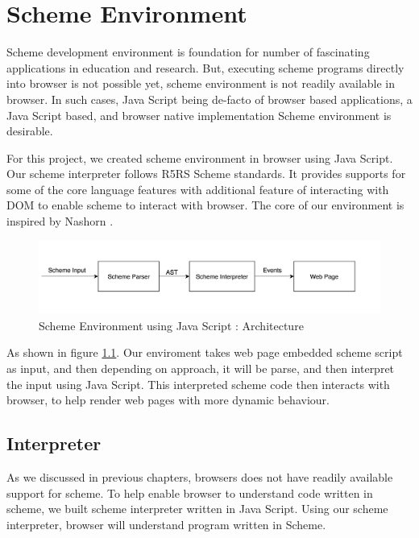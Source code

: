 \chapter{Scheme Environment}

Scheme development environment is foundation for number of fascinating applications in education and research. But, executing scheme programs directly into browser is not possible yet, scheme environment is not readily available in browser. In such cases, Java Script being de-facto of browser based applications, a Java Script based, and browser native implementation Scheme environment is desirable.

For this project, we created scheme environment in browser using Java Script. Our scheme interpreter follows R5RS Scheme standards. It provides supports for some of the core language features with additional feature of interacting with DOM to enable scheme to interact with browser.  The core of our environment is inspired by Nashorn \cite{javascripting}. 

\begin{figure}[ht]
	\begin{center}
		\includegraphics[width=\linewidth]{./images/SchemeEnvironmentusingJavaScript.png}
	\end{center}
	\caption{Scheme Environment using Java Script : Architecture}
	\label{fig:SchemeEnvironmentusingJavaScript}
\end{figure}


As shown in figure \ref{fig:SchemeEnvironmentusingJavaScript}. Our enviroment takes web page embedded scheme script as input, and then depending on approach, it will be parse, and then interpret the input using Java Script. This interpreted  scheme code then interacts with browser, to help render web pages with more dynamic behaviour. 

\section{Interpreter} 
As we discussed in previous chapters, browsers does not have readily available support for scheme. To help enable browser to understand code written in scheme, we built scheme interpreter written in Java Script. Using our scheme interpreter, browser will understand program written in Scheme.


